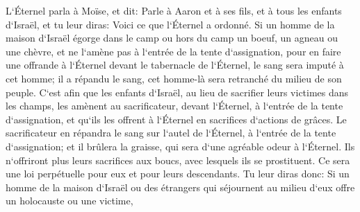 \verse L`Éternel parla à Moïse, et dit: 
\verse Parle à Aaron et à ses fils, et à tous les enfants d`Israël, et tu leur diras: Voici ce que l`Éternel a ordonné. 
\verse Si un homme de la maison d`Israël égorge dans le camp ou hors du camp un boeuf, un agneau ou une chèvre, 
\verse et ne l`amène pas à l`entrée de la tente d`assignation, pour en faire une offrande à l`Éternel devant le tabernacle de l`Éternel, le sang sera imputé à cet homme; il a répandu le sang, cet homme-là sera retranché du milieu de son peuple. 
\verse C`est afin que les enfants d`Israël, au lieu de sacrifier leurs victimes dans les champs, les amènent au sacrificateur, devant l`Éternel, à l`entrée de la tente d`assignation, et qu`ils les offrent à l`Éternel en sacrifices d`actions de grâces. 
\verse Le sacrificateur en répandra le sang sur l`autel de l`Éternel, à l`entrée de la tente d`assignation; et il brûlera la graisse, qui sera d`une agréable odeur à l`Éternel. 
\verse Ils n`offriront plus leurs sacrifices aux boucs, avec lesquels ils se prostituent. Ce sera une loi perpétuelle pour eux et pour leurs descendants. 
\verse Tu leur diras donc: Si un homme de la maison d`Israël ou des étrangers qui séjournent au milieu d`eux offre un holocauste ou une victime, 
